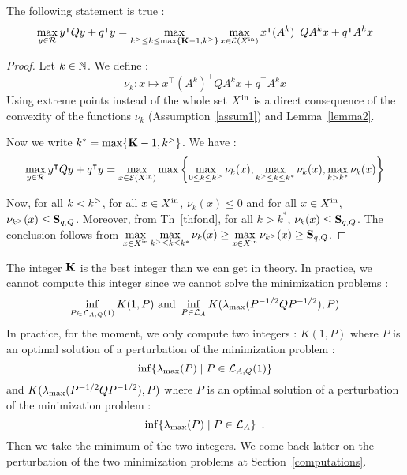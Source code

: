 \documentclass[10pt]{article}
\begin{document}
\begin{corollary}
The following statement is true :
 \[
\max_{y\in\mathcal{R}} y^\intercal Q y+q^\intercal y=\max_{k^{>}\leq k\leq \max\{\mathbf{K}-1,k^{>}\}} \max_{x\in \mathcal{E}(X^\mathrm{in})} x^\intercal (A^k)^\intercal Q A^k x+q^\intercal A^k x
\]
\end{corollary}

\begin{proof}
Let $k\in\mathbb{N}$. We define :
\[
\nu_k:x\mapsto x^\intercal (A^k)^\intercal Q A^k x+q^\intercal A^k x 
\]
Using extreme points instead of the whole set $X^\mathrm{in}$ is a direct consequence of the convexity of the functions $\nu_k$ (Assumption~\ref{assum1}) and Lemma~\ref{lemma2}.

Now we write $k^*=\max\{\mathbf{K}-1,k^{>}\}$. We have :
 \[
\max_{y\in\mathcal{R}} y^\intercal Q y+q^\intercal y
=\max_{x\in \mathcal{E}(X^\mathrm{in})}\max\left\{\max_{0\leq k\leq k^{>}} \nu_k(x), \max_{k^{>} \leq k\leq k^*} \nu_k(x),\max_{k>k^*} \nu_k(x)\right\}
\]

Now, for all $k< k^{>}$, for all $x\in X^\mathrm{in}$, $\nu_k(x)\leq 0$ and for all $x\in X^\mathrm{in}$, $\nu_{k^{>}}(x)\leq \mathbf{S}_{q,Q}$. Moreover, from Th~\ref{thfond}, 
for all $k>k^*$, $\nu_k(x)\leq \mathbf{S}_{q,Q}$. The conclusion follows from $\displaystyle{\max_{x\in X^\mathrm{in}} \max_{k^{>}\leq k\leq k^*} \nu_k(x)\geq \max_{x\in X^\mathrm{in}} \nu_{k^{>}}(x)\geq \mathbf{S}_{q,Q}}$. 
\end{proof}
The integer $\mathbf{K}$ is the best integer than we can get in theory. In practice, we cannot compute this integer since we cannot solve the minimization problems :
\[
\inf_{P\in\mathcal{L}_{A,Q}(1)} K(1,P)\text{ and }\inf_{P\in\mathcal{L}_{A}}K(\lambda_{\operatorname{max}}(P^{-1/2} Q P^{-1/2}),P)
\]
In practice, for the moment, we only compute two integers : $K( 1,P)$ where $P$ is an optimal solution of a perturbation of the minimization problem : 
\begin{equation}
\label{minlmaxQ}
\inf\{\lambda_{\operatorname{max}}(P)\mid P\in \mathcal{L}_{A,Q}(1)\}
\end{equation}
and $K(\lambda_{\operatorname{max}}(P^{-1/2} Q P^{-1/2}),P)$ where $P$ is an optimal solution of a perturbation of the minimization problem :
\begin{equation}
\label{minlyap}
\inf\{\lambda_{\operatorname{max}}(P)\mid P\in\mathcal{L}_{A}\}\enspace .
\end{equation}
Then we take the minimum of the  two integers. We come back latter on the perturbation of the two minimization problems at Section~\ref{computations}.
\end{document}

